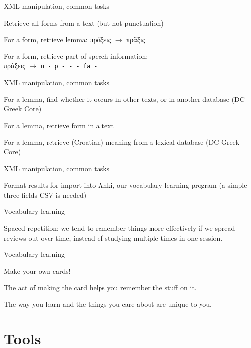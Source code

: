 \documentclass{beamer}
\begin{document}
\begin{frame}{XML manipulation, common tasks}

Retrieve all forms from a text (but not punctuation)

For a form, retrieve lemma: πράξεις $\rightarrow$ πρᾶξις

For a form, retrieve part of speech information: \\
πράξεις $\rightarrow$ \texttt{n - p - - - fa -}


\end{frame}

\begin{frame}{XML manipulation, common tasks}

For a lemma, find whether it occurs in other texts, or in another database (DC Greek Core)

For a lemma, retrieve form in a text

For a lemma, retrieve (Croatian) meaning from a lexical database (DC Greek Core)


\end{frame}

\begin{frame}{XML manipulation, common tasks}

Format results for import into Anki, our vocabulary learning program (a simple three-fields CSV is needed)

\end{frame}

\begin{frame}{Vocabulary learning}

\alert{Spaced repetition}: we tend to remember things more effectively if we spread reviews out over time, instead of studying multiple times in one session.

\end{frame}

\begin{frame}{Vocabulary learning}

\alert{Make your own cards!}

The act of making the card helps you remember the stuff on it.

The way you learn and the things you care about are unique to you.

\end{frame}

\section{Tools}
\end{document}

